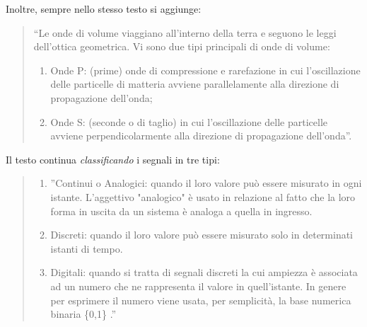 \documentclass[a4paper]{report} %
\begin{document}
Inoltre, sempre nello stesso testo si aggiunge:
\begin{quote}	
	``Le onde di volume viaggiano all'interno della terra e seguono le leggi dell'ottica geometrica. Vi sono due tipi principali di onde di volume:
	
	\begin{enumerate}
		\item Onde P: (prime) onde di compressione e rarefazione in cui l'oscillazione delle particelle di matteria avviene parallelamente alla direzione di propagazione dell'onda; 
		\item Onde S: (seconde o di taglio) in cui l'oscillazione delle particelle avviene perpendicolarmente alla direzione di propagazione dell'onda''.
	\end{enumerate}
\end{quote}
Il testo continua \textit{classificando} i segnali in tre tipi:
\begin{quote}
	\begin{enumerate}
		\item ''Continui o Analogici: quando il loro valore può essere misurato in ogni istante. L'aggettivo "analogico" è usato in relazione al fatto che la loro forma in uscita da un sistema è analoga a quella in ingresso.
		\item Discreti: quando il loro valore può essere misurato solo in determinati istanti di tempo.
		\item Digitali: quando si tratta di segnali discreti la cui ampiezza è associata ad un numero che ne rappresenta il valore in quell'istante. In genere per esprimere il numero viene usata, per semplicità, la base numerica binaria \{0,1\} .''
	\end{enumerate}
\end{quote}
\end{document}
